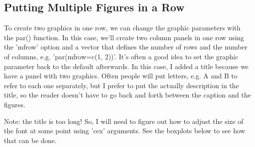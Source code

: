 \documentclass{article}\usepackage[]{graphicx}\usepackage[]{color}
\begin{document}
\subsection{Putting Multiple Figures in a Row}

To create two graphics in one row, we can change the graphic parameters with the par() function. In this case, we'll create two column panels in one row using the 'mfrow' option and a vector that defines the number of rows and the number of columns, e.g. 'par(mfrow=c(1, 2))'. It's often a good idea to set the graphic parameter back to the default afterwards. In this case, I added a title because we have a panel with two graphics. Often people will put letters, e.g. A and B to refer to each one separately, but I prefer to put the actually description in the title, so the reader doesn't have to go back and forth between the caption and the figures. 

Note: the title is too long! So, I will need to figure out how to adjust the size of the font at some point using 'cex' arguments. See the boxplots below to see how that can be done.
\end{document}
